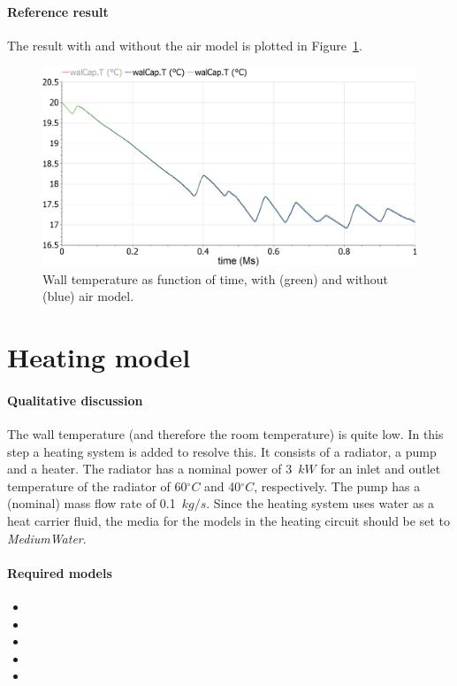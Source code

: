 \documentclass[10pt,a4paper]{article}
\begin{document}
\paragraph{Reference result}
The result with and without the air model is plotted in Figure~\ref{fig:res3}.
\begin{figure}[h]
\centering
\includegraphics[width=0.6\columnwidth]{img/result3.png}
\caption{Wall temperature as function of time, with (green) and without (blue) air model.}
\label{fig:res3}
\end{figure}



\newpage
\section{Heating model}
\paragraph{Qualitative discussion}
The wall temperature (and therefore the room temperature) is quite low. In this step a heating system is added to resolve this. It consists of a radiator, a pump and a heater. The radiator has a nominal power of 3~$kW$ for an inlet and outlet temperature of the radiator of 60$^{\circ}C$ and 40$^{\circ}C$, respectively. The pump has a (nominal) mass flow rate of 0.1~$kg/s$. Since the heating system uses water as a heat carrier fluid, the media for the models in the heating circuit should be set to \textit{MediumWater}.

\paragraph{Required models}
\begin{itemize}
\item {}
\item {}
\item {}
\item {}
\item {}
\end{itemize}
\end{document}
